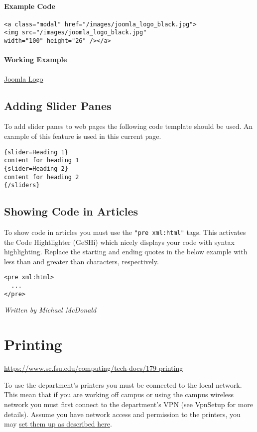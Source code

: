 \documentclass[12pt,a4paper]{article}
\begin{document}
\paragraph{Example Code}
\begin{verbatim}
<a class="modal" href="/images/joomla_logo_black.jpg">
<img src="/images/joomla_logo_black.jpg" 
width="100" height="26" /></a>
\end{verbatim}
\paragraph{Working Example}
\href{/images/joomla_logo_black.jpg}{Joomla Logo}

\subsection*{Adding Slider Panes}
To add slider panes to web pages the following code template should be used. An example of this feature is used in this current page.
\begin{verbatim}
{slider=Heading 1}
content for heading 1
{slider=Heading 2}
content for heading 2
{/sliders}
\end{verbatim}

\subsection*{Showing Code in Articles}
To show code in articles you must use the \texttt{"pre xml:html"} tags. This activates the Code Hightlighter (GeSHi) which nicely displays your code with syntax highlighting. Replace the starting and ending quotes in the below example with less than and greater than characters, respectively.
\begin{verbatim}
<pre xml:html>
  ...
</pre>
\end{verbatim}
\hfill \textit{Written by Michael McDonald}

\section{Printing}
\url{https://www.sc.fsu.edu/computing/tech-docs/179-printing}

To use the department's printers you must be connected to the local network. This mean that if you are working off campus or using the campus wireless network you must first connect to the department's VPN (see VpnSetup for more details). Assume you have network access and permission to the printers, you may \href{https://www.sc.fsu.edu/computing/tech-docs/206-network-printer-setup}{set them up as described here}.
\end{document}
